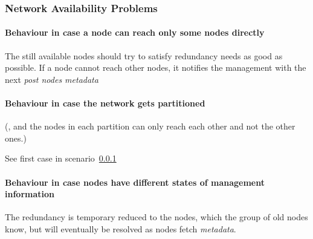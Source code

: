 \subsubsection{Network Availability Problems}\label{sec:scenario-network-errors}
\paragraph{Behaviour in case a node can reach only some nodes directly}
The still available nodes should try to satisfy redundancy needs as good as possible.
If a node cannot reach other nodes, it notifies the management with the next \emph{post nodes metadata}

\paragraph{Behaviour in case the network gets partitioned}
(, and the nodes in each partition can only reach each other and not the other ones.)

See first case in scenario~\ref{sec:scenario-network-errors}

\paragraph{Behaviour in case nodes have different states of management information}
The redundancy is temporary reduced to the nodes, which the group of old nodes know, but will eventually be resolved as nodes fetch \emph{metadata}. %